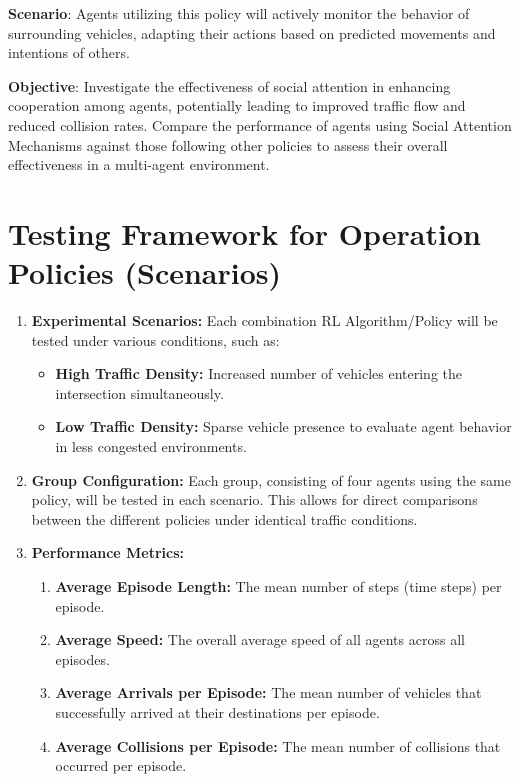 \begin{enumerate}
    \textbf{Scenario}: Agents utilizing this policy will actively monitor the behavior of surrounding vehicles, adapting their actions based on predicted movements and intentions of others.

    \textbf{Objective}: Investigate the effectiveness of social attention in enhancing cooperation among agents, potentially leading to improved traffic flow and reduced collision rates. 
    Compare the performance of agents using Social Attention Mechanisms against those following other policies to assess their overall effectiveness in a multi-agent environment.
\end{enumerate}


\section{Testing Framework for Operation Policies (Scenarios)}

\begin{enumerate}
    \item \textbf{Experimental Scenarios:} Each combination RL Algorithm/Policy  will be tested under various conditions, such as:
    \begin{itemize}
        \item \textbf{High Traffic Density:} Increased number of vehicles entering the intersection simultaneously.
        \item \textbf{Low Traffic Density:} Sparse vehicle presence to evaluate agent behavior in less congested environments.
    \end{itemize}
    \item \textbf{Group Configuration:} Each group, consisting of four agents using the same policy, will be tested in each scenario. This allows for direct comparisons between the different policies under identical traffic conditions.
    \item \textbf{Performance Metrics:}
    \begin{enumerate}
        \item \textbf{Average Episode Length:} The mean number of steps (time steps) per episode.
        \item \textbf{Average Speed:} The overall average speed of all agents across all episodes.
        \item \textbf{Average Arrivals per Episode:} The mean number of vehicles that successfully arrived at their destinations per episode.
        \item \textbf{Average Collisions per Episode:} The mean number of collisions that occurred per episode.
    \end{enumerate}
\end{enumerate}


